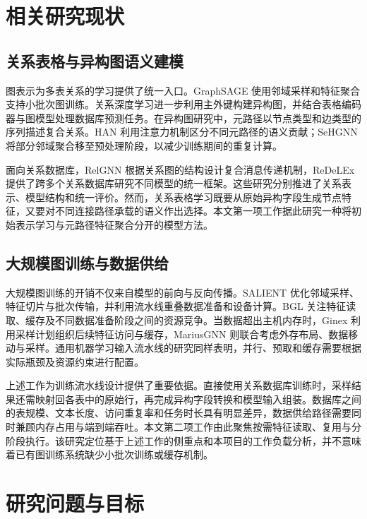 \section{相关研究现状}

\subsection{关系表格与异构图语义建模}

图表示为多表关系的学习提供了统一入口。GraphSAGE 使用邻域采样和特征聚合支持小批次图训练\cite{hamilton2017graphsage}。关系深度学习进一步利用主外键构建异构图，并结合表格编码器与图模型处理数据库预测任务\cite{fey2024rdl}。在异构图研究中，元路径以节点类型和边类型的序列描述复合关系。HAN 利用注意力机制区分不同元路径的语义贡献\cite{wang2019han}；SeHGNN 将部分邻域聚合移至预处理阶段，以减少训练期间的重复计算\cite{yang2023sehgnn}。

面向关系数据库，RelGNN 根据关系图的结构设计复合消息传递机制\cite{chen2025relgnn}，ReDeLEx 提供了跨多个关系数据库研究不同模型的统一框架\cite{peleska2025redelex}。这些研究分别推进了关系表示、模型结构和统一评价。然而，关系表格学习既要从原始异构字段生成节点特征，又要对不同连接路径承载的语义作出选择。本文第一项工作据此研究一种将初始表示学习与元路径特征聚合分开的模型方法。

\subsection{大规模图训练与数据供给}

大规模图训练的开销不仅来自模型的前向与反向传播。SALIENT 优化邻域采样、特征切片与批次传输，并利用流水线重叠数据准备和设备计算\cite{kaler2022salient}。BGL 关注特征读取、缓存及不同数据准备阶段之间的资源竞争\cite{liu2023bgl}。当数据超出主机内存时，Ginex 利用采样计划组织后续特征访问与缓存\cite{park2022ginex}，MariusGNN 则联合考虑外存布局、数据移动与采样\cite{waleffe2023mariusgnn}。通用机器学习输入流水线的研究同样表明，并行、预取和缓存需要根据实际瓶颈及资源约束进行配置\cite{kuchnik2022plumber}。

上述工作为训练流水线设计提供了重要依据。直接使用关系数据库训练时，采样结果还需映射回各表中的原始行，再完成异构字段转换和模型输入组装。数据库之间的表规模、文本长度、访问重复率和任务时长具有明显差异，数据供给路径需要同时兼顾内存占用与端到端吞吐。本文第二项工作由此聚焦按需特征读取、复用与分阶段执行。该研究定位基于上述工作的侧重点和本项目的工作负载分析，并不意味着已有图训练系统缺少小批次训练或缓存机制。

\section{研究问题与目标}

